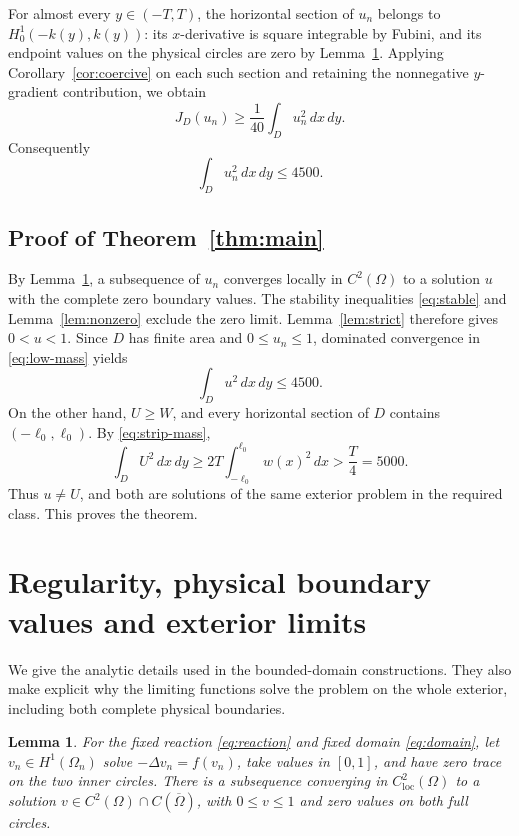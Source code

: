 \documentclass[11pt]{article}
\newtheorem{lemma}[theorem]{Lemma}
\begin{document}
For almost every \(y\in(-T,T)\), the horizontal section of \(u_n\)
belongs to \(H^1_0(-k(y),k(y))\): its \(x\)-derivative is square
integrable by Fubini, and its endpoint values on the physical circles
are zero by Lemma~\ref{lem:limits}.
Applying Corollary~\ref{cor:coercive} on each such section and retaining
the nonnegative \(y\)-gradient contribution, we obtain
\[
 J_D(u_n)\ge\frac1{40}\int_Du_n^2\,dx\,dy.
\]
Consequently
\begin{equation}\label{eq:low-mass}
 \int_Du_n^2\,dx\,dy\le4500.
\end{equation}

\subsection{Proof of Theorem~\ref{thm:main}}

By Lemma~\ref{lem:limits}, a subsequence of \(u_n\) converges locally
in \(C^2(\Omega)\) to a solution \(u\) with the complete zero boundary
values. The stability inequalities \eqref{eq:stable} and
Lemma~\ref{lem:nonzero} exclude the zero limit.
Lemma~\ref{lem:strict} therefore gives \(0<u<1\).
Since \(D\) has finite area and \(0\le u_n\le1\), dominated convergence
in \eqref{eq:low-mass} yields
\[
 \int_Du^2\,dx\,dy\le4500.
\]
On the other hand, \(U\ge W\), and every horizontal section of \(D\)
contains \((-\ell_0,\ell_0)\). By \eqref{eq:strip-mass},
\[
 \int_DU^2\,dx\,dy
 \ge2T\int_{-\ell_0}^{\ell_0}w(x)^2\,dx
 >\frac{T}{4}=5000.
\]
Thus \(u\ne U\), and both are solutions of the same exterior problem
in the required class. This proves the theorem.

\appendix
\section{Regularity, physical boundary values and exterior limits}
\label{app:limits}

We give the analytic details used in the bounded-domain constructions.
They also make explicit why the limiting functions solve the problem on
the whole exterior, including both complete physical boundaries.

\begin{lemma}\label{lem:limits}
For the fixed reaction \eqref{eq:reaction} and fixed domain
\eqref{eq:domain}, let \(v_n\in H^1(\Omega_n)\) solve
\(-\Delta v_n=f(v_n)\), take values in \([0,1]\), and have zero trace
on the two inner circles.
There is a subsequence converging in \(C^2_{\mathrm{loc}}(\Omega)\)
to a solution \(v\in C^2(\Omega)\cap C(\overline\Omega)\), with
\(0\le v\le1\) and zero values on both full circles.
\end{lemma}
\end{document}
